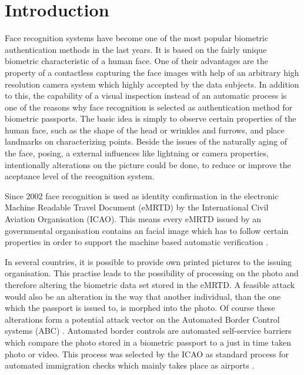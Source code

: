 \section{Introduction}
Face recognition systems have become one of the most popular biometric authentication methods in the last years. It is based on the fairly unique biometric characteristic of a human face. One of their advantages are the property of a contactless capturing the face images with help of an arbitrary high resolution camera system which highly accepted by the data subjects. In addition to this, the capability of a visual inspection instead of an automatic process is one of the reasons why face recognition is selected as authentication method for biometric passports. 
The basic idea is simply to observe certain properties of the human face, such as the shape of the head or wrinkles and furrows, and place landmarks on characterizing points. 
Beside the issues of the naturally aging of the face, posing, a external influences like lightning or camera properties, intentionally alterations on the picture could be done, to reduce or improve the aceptance level of the recognition system.

Since 2002 \cite{del2016automated} face recognition is used as identity confirmation in the electronic Machine Readable Travel Document (eMRTD) by the  International Civil Aviation Organisation (ICAO). This means every eMRTD issued by an governmental organisation contains an facial image which has to follow certain properties in order to support the machine based automatic verification \cite{bdi2010Verordnung}. 

In several countries, it is possible to provide own printed pictures to the issuing organisation. This practise leads to the possibility of processing on the photo and therefore altering the biometric data set stored in the eMRTD. A feasible attack would also be an alteration in the way that another individual, than the one which the passport is issued to, is morphed into the photo.  Of course these alterations form a potential attack vector on the Automated Border Control systems (ABC) . Automated border controls are automated self-service barriers which compare the  photo stored in a biometric passport to a just in time taken photo or video. This process was selected by the ICAO as standard process for automated immigration checks which mainly takes place as airports \cite{del2016automated}. 

